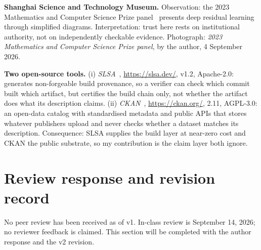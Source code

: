 \textbf{Shanghai Science and Technology Museum.} Observation: the 2023 Mathematics and Computer Science Prize panel~\cite{futureprize2023} presents deep residual learning through simplified diagrams. Interpretation: trust here rests on institutional authority, not on independently checkable evidence. Photograph: \emph{2023 Mathematics and Computer Science Prize panel}, by the author, 4 September 2026.

\textbf{Two open-source tools.} (i) \emph{SLSA}~\cite{slsa}, \url{https://slsa.dev/}, v1.2, Apache-2.0: generates non-forgeable build provenance, so a verifier can check which commit built which artifact, but certifies the build chain only, not whether the artifact does what its description claims. (ii) \emph{CKAN}~\cite{ckan}, \url{https://ckan.org/}, 2.11, AGPL-3.0: an open-data catalog with standardised metadata and public APIs that stores whatever publishers upload and never checks whether a dataset matches its description. Consequence: SLSA supplies the build layer at near-zero cost and CKAN the public substrate, so my contribution is the claim layer both ignore.

\section{Review response and revision record}
No peer review has been received as of v1. In-class review is September 14, 2026; no reviewer feedback is claimed. This section will be completed with the author response and the v2 revision.

\clearpage\onecolumn
